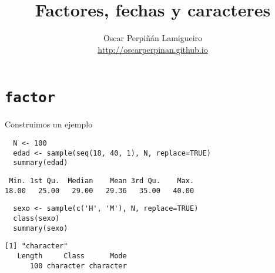 \documentclass[xcolor={usenames,svgnames,dvipsnames}]{beamer}
\author{Oscar Perpiñán Lamigueiro \\ \url{http://oscarperpinan.github.io}}
\date{}
\title{Factores, fechas y caracteres}
\begin{document}
\maketitle


\section{\texttt{factor}}
\label{sec:org9843d92}
\begin{frame}[fragile,label={sec:orgcd2c6eb}]{Construimos un ejemplo}
 \lstset{language=r,label= ,caption= ,captionpos=b,numbers=none}
\begin{lstlisting}
  N <- 100
  edad <- sample(seq(18, 40, 1), N, replace=TRUE)
  summary(edad)
\end{lstlisting}

\begin{verbatim}
 Min. 1st Qu.  Median    Mean 3rd Qu.    Max. 
18.00   25.00   29.00   29.36   35.00   40.00
\end{verbatim}

\lstset{language=r,label= ,caption= ,captionpos=b,numbers=none}
\begin{lstlisting}
  sexo <- sample(c('H', 'M'), N, replace=TRUE)
  class(sexo)
  summary(sexo)
\end{lstlisting}

\begin{verbatim}
[1] "character"
   Length     Class      Mode 
      100 character character
\end{verbatim}
\end{frame}
\end{document}
